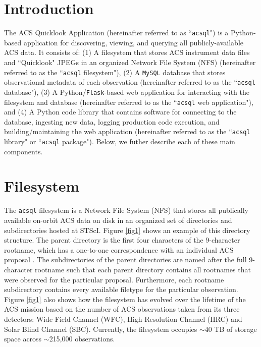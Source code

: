 \documentclass[11pt,twoside]{article}
\begin{document}
\section{Introduction}

The ACS Quicklook Application (hereinafter referred to as ``\texttt{acsql}") is a Python-based application for discovering, viewing, and
querying all publicly-available ACS data.  It consists of: (1) A filesystem that stores ACS instrument data files
and ``Quicklook" JPEGs in an organized Network File System (NFS) (hereinafter referred to as the ``\texttt{acsql} filesystem"), (2) A
\texttt{MySQL} database that stores observational metadata of each observation (hereinafter referred to as the ``\texttt{acsql} database"),
(3) A Python/\texttt{Flask}-based web application for interacting with the filesystem and database (hereinafter referred to as the
``\texttt{acsql} web application"), and (4) A Python code library that contains software for connecting to the database, ingesting new data,
logging production code execution, and building/maintaining the web application (hereinafter referred to as the ``\texttt{acsql} library"
or ``\texttt{acsql} package").  Below, we futher describe each of these main components.


\section{Filesystem}

The \texttt{acsql} filesystem is a Network File System (NFS) that stores all publically available on-orbit ACS data on disk in an
organized set of directories and subdirectories hosted at STScI. Figure \ref{fig1} shows an example of this directory structure.  The
parent directory is the first four characters of the 9-character rootname, which has a one-to-one correspondence with an
individual ACS proposal \citet{Smith}. The subdirectories of the parent directories are named after the full 9-character rootname such that
each parent directory contains all rootnames that were observed for the particular proposal.  Furthermore, each rootname
subdirectory contains every available filetype for the particular observation. Figure \ref{fig1} also shows how the filesystem has
evolved over the lifetime of the ACS mission based on the number of ACS observations taken from its three detectors: Wide Field Channel (WFC),
High Resolution Channel (HRC) and Solar Blind Channel (SBC).  Currently, the filesystem occupies $\sim${40} TB of storage space across
$\sim$215,000 observations.
\end{document}
